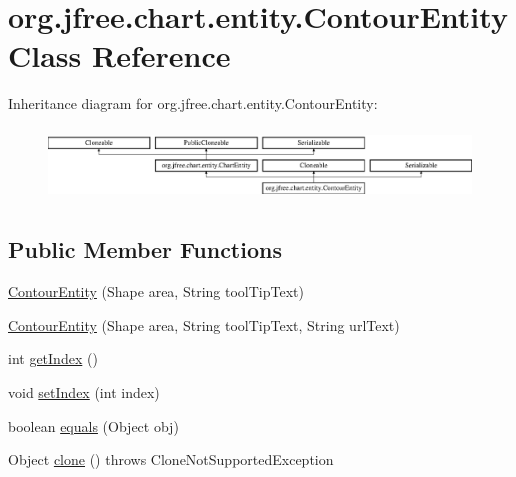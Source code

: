 \hypertarget{classorg_1_1jfree_1_1chart_1_1entity_1_1_contour_entity}{}\section{org.\+jfree.\+chart.\+entity.\+Contour\+Entity Class Reference}
\label{classorg_1_1jfree_1_1chart_1_1entity_1_1_contour_entity}
Inheritance diagram for org.\+jfree.\+chart.\+entity.\+Contour\+Entity\+:\begin{figure}[H]
\begin{center}
\leavevmode
\includegraphics[height=1.944444cm]{classorg_1_1jfree_1_1chart_1_1entity_1_1_contour_entity}
\end{center}
\end{figure}
\subsection*{Public Member Functions}
\begin{DoxyCompactItemize}
\item 
\mbox{\hyperlink{classorg_1_1jfree_1_1chart_1_1entity_1_1_contour_entity_a43fc67a1711a5a4b83494ed4352618e7}{Contour\+Entity}} (Shape area, String tool\+Tip\+Text)
\item 
\mbox{\hyperlink{classorg_1_1jfree_1_1chart_1_1entity_1_1_contour_entity_ac4d377748f6cfa0750d76851192e0336}{Contour\+Entity}} (Shape area, String tool\+Tip\+Text, String url\+Text)
\item 
int \mbox{\hyperlink{classorg_1_1jfree_1_1chart_1_1entity_1_1_contour_entity_a54d1bf8e78c3b86970e776fa744fecf7}{get\+Index}} ()
\item 
void \mbox{\hyperlink{classorg_1_1jfree_1_1chart_1_1entity_1_1_contour_entity_ab1b1b899f14d3a67cd7dc76e972979f9}{set\+Index}} (int index)
\item 
boolean \mbox{\hyperlink{classorg_1_1jfree_1_1chart_1_1entity_1_1_contour_entity_a62057918f715387eb919a4d382e6046c}{equals}} (Object obj)
\item 
Object \mbox{\hyperlink{classorg_1_1jfree_1_1chart_1_1entity_1_1_contour_entity_aee266a088781fecb47b709af1164d30b}{clone}} ()  throws Clone\+Not\+Supported\+Exception 
\end{DoxyCompactItemize}


